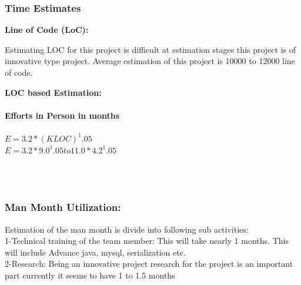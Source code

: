 \subsubsection{\textbf{Time Estimates}}
\textbf{Line of Code (LoC):}
\begin{flushleft}
	Estimating LOC for this project is difficult at estimation stages this project is of innovative
	type project. Average estimation of this project is 10000 to 12000 line of code.
\end{flushleft}
\textbf{LOC based Estimation:}\\ \\
\textbf{Efforts in Person in months}\\ \\
\(E=3.2*(KLOC)^1 .05 \) \\
\(E=3.2*9.0^1 .05 to 11.0 *4.2^1 .05\)\\
\\\\ \newline
\subsubsection{\textbf{Man Month Utilization:}}
Estimation of the man month is divide into following sub activities:\\
1-Technical training of the team member: This will take nearly 1 months. This will include Advance java, mysql, serialization etc.\\
2-Research: Being an innovative project research for the project is an important part currently it seems to have 1 to 1.5 months

